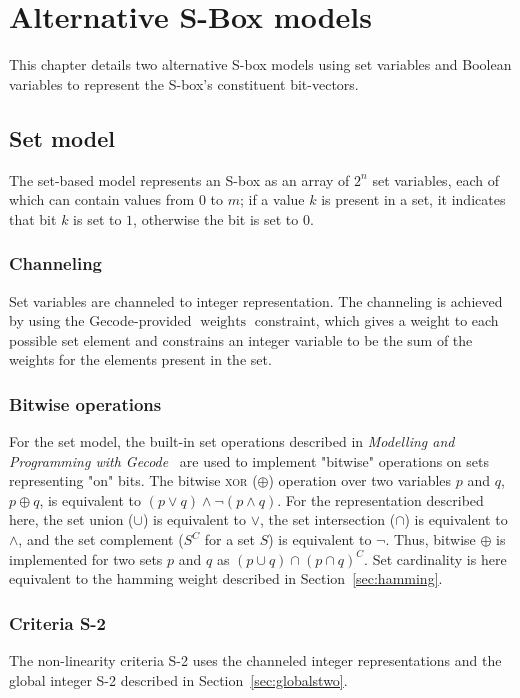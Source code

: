 \documentclass[a4paper,10pt,twoside,openright]{book}
\renewcommand{\sc}[1]{\textsc{\lowercase{#1}}}
\DeclareMathOperator{\weights}{weights}
\begin{document}
\chapter{Alternative S-Box models}
\label{sec:altmodels}
This chapter details two alternative S-box models using set variables and Boolean variables
to represent the S-box's constituent bit-vectors.

\section{Set model}
\label{sec:setmodel}
The set-based model represents an S-box as an array of $2^n$ set variables, 
each of which can contain values from $0$ to $m$; 
if a value $k$ is present in a set, it indicates that bit $k$ is set to $1$,
otherwise the bit is set to $0$.

\subsection{Channeling}
Set variables are channeled to integer representation.
The channeling is achieved by using the Gecode-provided $\weights$ constraint, which gives a weight to each possible set element and constrains an integer variable to be the sum of the weights for the elements present in the set.

\subsection{Bitwise operations}
\label{sec:setbitwise}
For the set model, the built-in set operations described in
\textit{Modelling and Programming with Gecode}~\cite{MPG:M} 
are used to implement "bitwise" operations on sets representing "on" bits. 
The bitwise \sc{xor} ($\oplus$) operation over two variables $p$ and $q$, $p \oplus q$, 
is equivalent to $(p \lor q) \land \lnot(p \land q)$. 
For the representation described here, the set union ($\cup$) is equivalent to $\lor$, 
the set intersection ($\cap$) is equivalent to $\land$, 
and the set complement ($S^C$ for a set $S$) is equivalent to $\lnot$. 
Thus, bitwise $\oplus$ is implemented for two sets $p$ and $q$ as
$(p \cup q) \cap (p \cap q)^C$.
Set cardinality is here equivalent to the hamming weight described in Section~\ref{sec:hamming}.

\subsection{Criteria S-2}
The non-linearity criteria S-2 uses the channeled integer representations 
and the global integer S-2 described in Section~\ref{sec:globalstwo}.
\end{document}
